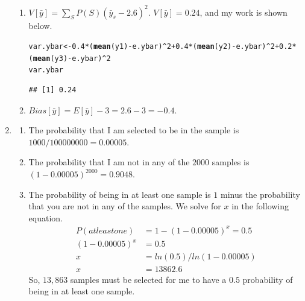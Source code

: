 \documentclass[12pt]{article}\usepackage[]{graphicx}\usepackage[]{color}
\makeatletter
\newcommand{\hlnum}[1]{\textcolor[rgb]{0.686,0.059,0.569}{#1}}%
\newcommand{\hlopt}[1]{\textcolor[rgb]{0,0,0}{#1}}%
\newcommand{\hlstd}[1]{\textcolor[rgb]{0.345,0.345,0.345}{#1}}%
\newcommand{\hlkwb}[1]{\textcolor[rgb]{0.69,0.353,0.396}{#1}}%
\newcommand{\hlkwd}[1]{\textcolor[rgb]{0.737,0.353,0.396}{\textbf{#1}}}%
\newenvironment{kframe}{%
 \def\at@end@of@kframe{}%
 \ifinner\ifhmode%
  \def\at@end@of@kframe{\end{minipage}}%
  \begin{minipage}{\columnwidth}%
 \fi\fi%
 \def\FrameCommand##1{\hskip\@totalleftmargin \hskip-\fboxsep
 \colorbox{shadecolor}{##1}\hskip-\fboxsep
     \hskip-\linewidth \hskip-\@totalleftmargin \hskip\columnwidth}%
 \MakeFramed {\advance\hsize-\width
   \@totalleftmargin\z@ \linewidth\hsize
   \@setminipage}}%
 {\par\unskip\endMakeFramed%
 \at@end@of@kframe}
\newenvironment{knitrout}{}{} %
\makeatother
\begin{document}
\begin{doublespacing}
\begin{enumerate}
\begin{enumerate}
\item $V[\bar{y}] = \sum_S P(S)(\bar{y}_s-2.6)^2$. $V[\bar{y}] = 0.24$, and my work is shown below.
\begin{knitrout}\footnotesize
{}\color{fgcolor}\begin{kframe}
\begin{alltt}
\hlstd{var.ybar} \hlkwb{<-} \hlnum{0.4}\hlopt{*}\hlstd{(}\hlkwd{mean}\hlstd{(y1)}\hlopt{-}\hlstd{e.ybar)}\hlopt{^}\hlnum{2}\hlopt{+}\hlnum{0.4}\hlopt{*}\hlstd{(}\hlkwd{mean}\hlstd{(y2)}\hlopt{-}\hlstd{e.ybar)}\hlopt{^}\hlnum{2}\hlopt{+}\hlnum{0.2}\hlopt{*}\hlstd{(}\hlkwd{mean}\hlstd{(y3)}\hlopt{-}\hlstd{e.ybar)}\hlopt{^}\hlnum{2}
\hlstd{var.ybar}
\end{alltt}
\begin{verbatim}
## [1] 0.24
\end{verbatim}
\end{kframe}
\end{knitrout}

\item $Bias[\bar{y}] = E[\bar{y}] - 3 = 2.6-3 = -0.4$.


\end{enumerate}

\item \begin{enumerate}
\item The probability that I am selected to be in the sample is $1000/100000000 = 0.00005$.

\item The probability that I am not in any of the $2000$ samples is $(1-0.00005)^{2000} = 0.9048$.

\item The probability of being in at least one sample is $1$ minus the probability that you are not in any of the samples. We solve for $x$ in the following equation.
\begin{align*}
P(at least one) &= 1-(1-0.00005)^x = 0.5 \\
(1-0.00005)^x &= 0.5 \\
x &= ln(0.5)/ln(1-0.00005) \\
x &= 13862.6
\end{align*}
So, $13,863$ samples must be selected for me to have a $0.5$ probability of being in at least one sample.

\end{enumerate}

\end{enumerate}

\end{doublespacing}
\end{document}
